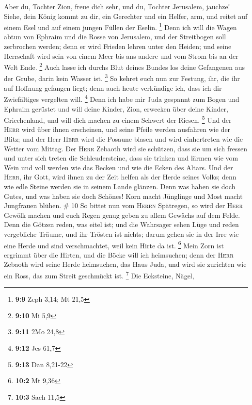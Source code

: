  Aber du, Tochter Zion, freue dich sehr, und du, Tochter
Jerusalem, jauchze! Siehe, dein König kommt zu dir, ein Gerechter und
ein Helfer, arm, und reitet auf einem Esel und auf einem jungen Füllen
der Eselin. \footnote{\textbf{9:9} Zeph 3,14; Mt 21,5} 
Denn ich will die Wagen abtun von Ephraim und die Rosse von Jerusalem,
und der Streitbogen soll zerbrochen werden; denn er wird Frieden lehren
unter den Heiden; und seine Herrschaft wird sein von einem Meer bis ans
andere und vom Strom bis an der Welt Ende. \footnote{\textbf{9:10} Mi
  5,9}  Auch lasse ich durchs Blut deines Bundes los
deine Gefangenen aus der Grube, darin kein Wasser ist. \footnote{\textbf{9:11}
  2Mo 24,8}  So kehret euch nun zur Festung, ihr, die ihr
auf Hoffnung gefangen liegt; denn auch heute verkündige ich, dass ich
dir Zwiefältiges vergelten will. \footnote{\textbf{9:12} Jes 61,7}
 Denn ich habe mir Juda gespannt zum Bogen und Ephraim
gerüstet und will deine Kinder, Zion, erwecken über deine Kinder,
Griechenland, und will dich machen zu einem Schwert der Riesen.
\footnote{\textbf{9:13} Dan 8,21-22}  Und der
\textsc{Herr} wird über ihnen erscheinen, und seine Pfeile werden
ausfahren wie der Blitz; und der Herr \textsc{Herr} wird die Posaune
blasen und wird einhertreten wie die Wetter vom Mittag. 
Der \textsc{Herr} Zebaoth wird sie schützen, dass sie um sich fressen
und unter sich treten die Schleudersteine, dass sie trinken und lärmen
wie vom Wein und voll werden wie das Becken und wie die Ecken des
Altars.  Und der \textsc{Herr}, ihr Gott, wird ihnen zu
der Zeit helfen als der Herde seines Volks; denn wie edle Steine werden
sie in seinem Lande glänzen.  Denn was haben sie doch
Gutes, und was haben sie doch Schönes! Korn macht Jünglinge und Most
macht Jungfrauen blühen. \# 10  So bittet nun vom
\textsc{Herrn} Spätregen, so wird der \textsc{Herr} Gewölk machen und
euch Regen genug geben zu allem Gewächs auf dem Felde. 
Denn die Götzen reden, was eitel ist; und die Wahrsager sehen Lüge und
reden vergebliche Träume, und ihr Trösten ist nichts; darum gehen sie in
der Irre wie eine Herde und sind verschmachtet, weil kein Hirte da ist.
\footnote{\textbf{10:2} Mt 9,36}  Mein Zorn ist ergrimmt
über die Hirten, und die Böcke will ich heimsuchen; denn der
\textsc{Herr} Zebaoth wird seine Herde heimsuchen, das Haus Juda, und
wird sie zurichten wie ein Ross, das zum Streit geschmückt ist.
\footnote{\textbf{10:3} Sach 11,5}  Die Ecksteine, Nägel,
